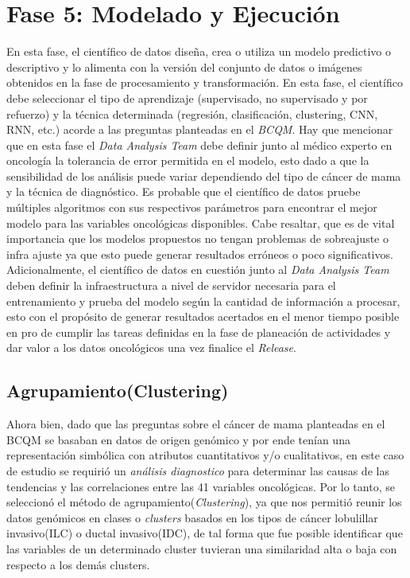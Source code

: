 \clearpage
\section{Fase 5: Modelado y Ejecución}
En esta fase, el científico de datos diseña, crea o utiliza un modelo predictivo o descriptivo y lo alimenta con la versión del conjunto de datos o imágenes obtenidos en la fase de procesamiento y transformación. En esta fase, el científico debe seleccionar el tipo de aprendizaje (supervisado, no supervisado y por refuerzo) y la técnica determinada (regresión, clasificación, clustering, CNN, RNN, etc.) acorde a las preguntas planteadas en el \textit{BCQM}. Hay que mencionar que en esta fase el \textit{Data Analysis Team} debe definir junto al médico experto en oncología la tolerancia de error permitida en el modelo, esto dado a que la sensibilidad de los análisis puede variar dependiendo del tipo de cáncer de mama y la técnica de diagnóstico. Es probable que el científico de datos pruebe múltiples algoritmos con sus respectivos parámetros para encontrar el mejor modelo para las variables oncológicas disponibles. Cabe resaltar, que es de vital importancia que los modelos propuestos no tengan problemas de sobreajuste o infra ajuste ya que esto puede generar resultados erróneos o poco significativos. Adicionalmente, el científico de datos en cuestión junto al \textit{Data Analysis Team} deben definir la infraestructura a nivel de servidor necesaria para el entrenamiento y prueba del modelo según la cantidad de información a procesar, esto con el propósito de generar resultados acertados en el menor tiempo posible en pro de cumplir las tareas definidas en la fase de planeación de actividades y dar valor a los datos oncológicos una vez finalice el \textit{Release}.

\subsection{Agrupamiento(Clustering)}
Ahora bien, dado que las preguntas sobre el cáncer de mama planteadas en el BCQM se basaban en datos de origen genómico y por ende tenían una representación simbólica con atributos cuantitativos y/o cualitativos, en este caso de estudio se requirió un \textit{análisis diagnostico} para determinar las causas de las tendencias y las correlaciones entre las 41 variables oncológicas. Por lo tanto, se seleccionó el método de agrupamiento(\textit{Clustering}), ya que nos permitió reunir los datos genómicos en clases o \textit{clusters} basados en los tipos de cáncer lobulillar invasivo(ILC) o ductal invasivo(IDC), de tal forma que fue posible identificar que las variables de un determinado cluster tuvieran una similaridad alta o baja con respecto a los demás clusters.

